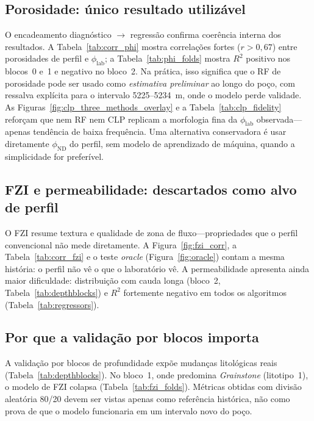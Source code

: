 \documentclass[11pt,a4paper]{article}
\newcommand{\philab}{\ensuremath{\phi_{\mathrm{lab}}}}
\newcommand{\phiND}{\ensuremath{\phi_{\mathrm{ND}}}}
\begin{document}
\subsection{Porosidade: único resultado utilizável}
\label{sec:discussao_phi}

O encadeamento diagnóstico $\rightarrow$ regressão confirma coerência
interna dos resultados.
A Tabela~\ref{tab:corr_phi} mostra correlações fortes ($r > 0{,}67$)
entre porosidades de perfil e \philab{}; a Tabela~\ref{tab:phi_folds}
mostra $R^2$ positivo nos blocos~0 e~1 e negativo no bloco~2.
Na prática, isso significa que o RF de porosidade pode ser usado como
\emph{estimativa preliminar} ao longo do poço, com ressalva explícita
para o intervalo 5225--5234~m, onde o modelo perde validade.
As Figuras~\ref{fig:clp_three_methods_overlay} e a
Tabela~\ref{tab:clp_fidelity} reforçam que nem RF nem CLP replicam a
morfologia fina da \philab{} observada---apenas tendência de baixa
frequência.
Uma alternativa conservadora é usar diretamente \phiND{} do perfil,
sem modelo de aprendizado de máquina, quando a simplicidade for preferível.

\subsection{FZI e permeabilidade: descartados como alvo de perfil}
\label{sec:discussao_fzi}

O FZI resume textura e qualidade de zona de fluxo---propriedades que o perfil
convencional não mede diretamente.
A Figura~\ref{fig:fzi_corr}, a Tabela~\ref{tab:corr_fzi} e o teste
\emph{oracle} (Figura~\ref{fig:oracle}) contam a mesma história: o perfil
não vê o que o laboratório vê.
A permeabilidade apresenta ainda maior dificuldade: distribuição com
cauda longa (bloco~2, Tabela~\ref{tab:depthblocks}) e $R^2$ fortemente
negativo em todos os algoritmos (Tabela~\ref{tab:regressors}).

\subsection{Por que a validação por blocos importa}

A validação por blocos de profundidade expõe mudanças litológicas
reais (Tabela~\ref{tab:depthblocks}).
No bloco~1, onde predomina \emph{Grainstone} (litotipo~1), o modelo de FZI colapsa
(Tabela~\ref{tab:fzi_folds}).
Métricas obtidas com divisão aleatória 80/20 devem ser vistas apenas
como referência histórica, não como prova de que o modelo funcionaria
em um intervalo novo do poço.
\end{document}

